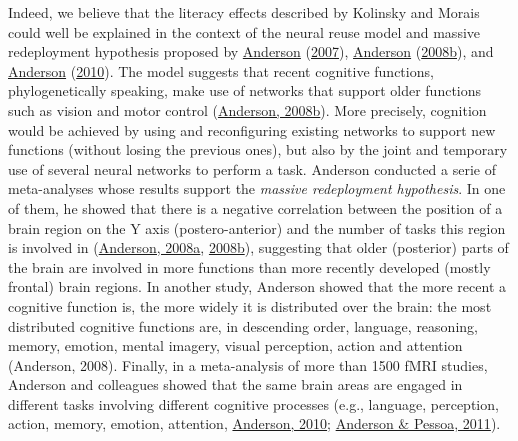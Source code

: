 \documentclass[
  a4paper,12pt,twoside,onecolumn,openright,final,oldfontcommands]{memoir}
\begin{document}
Indeed, we believe that the literacy effects described by Kolinsky and Morais could well be explained in the context of the neural reuse model and massive redeployment hypothesis proposed by \protect\hyperlink{ref-anderson_evolution_2007}{Anderson} (\protect\hyperlink{ref-anderson_evolution_2007}{2007}), \protect\hyperlink{ref-anderson_grounds_2008}{Anderson} (\protect\hyperlink{ref-anderson_grounds_2008}{2008b}), and \protect\hyperlink{ref-anderson_neural_2010}{Anderson} (\protect\hyperlink{ref-anderson_neural_2010}{2010}). The model suggests that recent cognitive functions, phylogenetically speaking, make use of networks that support older functions such as vision and motor control (\protect\hyperlink{ref-anderson_grounds_2008}{Anderson, 2008b}). More precisely, cognition would be achieved by using and reconfiguring existing networks to support new functions (without losing the previous ones), but also by the joint and temporary use of several neural networks to perform a task. Anderson conducted a serie of meta-analyses whose results support the \emph{massive redeployment hypothesis}. In one of them, he showed that there is a negative correlation between the position of a brain region on the Y axis (postero-anterior) and the number of tasks this region is involved in (\protect\hyperlink{ref-anderson_circuit_2008}{Anderson, 2008a}, \protect\hyperlink{ref-anderson_grounds_2008}{2008b}), suggesting that older (posterior) parts of the brain are involved in more functions than more recently developed (mostly frontal) brain regions. In another study, Anderson showed that the more recent a cognitive function is, the more widely it is distributed over the brain: the most distributed cognitive functions are, in descending order, language, reasoning, memory, emotion, mental imagery, visual perception, action and attention (Anderson, 2008). Finally, in a meta-analysis of more than 1500 fMRI studies, Anderson and colleagues showed that the same brain areas are engaged in different tasks involving different cognitive processes (e.g., language, perception, action, memory, emotion, attention, \protect\hyperlink{ref-anderson_neural_2010}{Anderson, 2010}; \protect\hyperlink{ref-anderson_quantifying_2011}{Anderson \& Pessoa, 2011}).
\end{document}

